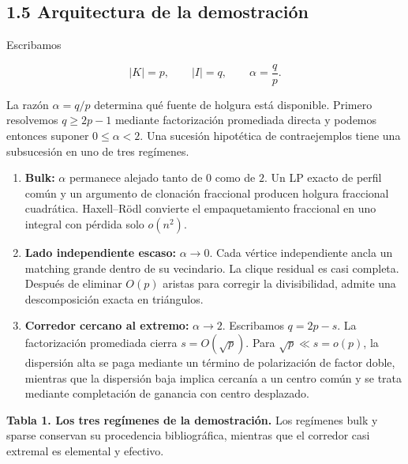 \documentclass[spanish,11pt,a4paper]{article}
\begin{document}
\subsection{1.5 Arquitectura de la
demostración}\label{arquitectura-de-la-demostraciuxf3n}

Escribamos

\[
|K|=p,
\qquad
|I|=q,
\qquad
\alpha=\frac qp.
\]

La razón \(\alpha=q/p\) determina qué fuente de holgura está disponible.
Primero resolvemos \(q\ge2p-1\) mediante factorización promediada
directa y podemos entonces suponer \(0\le\alpha<2\). Una sucesión
hipotética de contraejemplos tiene una subsucesión en uno de tres
regímenes.

\begin{enumerate}
\def\labelenumi{\arabic{enumi}.}
\item
  \textbf{Bulk:} \(\alpha\) permanece alejado tanto de \(0\) como de
  \(2\). Un LP exacto de perfil común y un argumento de clonación
  fraccional producen holgura fraccional cuadrática. Haxell--Rödl
  convierte el empaquetamiento fraccional en uno integral con pérdida
  solo \(o(n^2)\).
\item
  \textbf{Lado independiente escaso:} \(\alpha\to0\). Cada vértice
  independiente ancla un matching grande dentro de su vecindario. La
  clique residual es casi completa. Después de eliminar \(O(p)\) aristas
  para corregir la divisibilidad, admite una descomposición exacta en
  triángulos.
\item
  \textbf{Corredor cercano al extremo:} \(\alpha\to2\). Escribamos
  \(q=2p-s\). La factorización promediada cierra \(s=O(\sqrt p)\). Para
  \(\sqrt p\ll s=o(p)\), la dispersión alta se paga mediante un término
  de polarización de factor doble, mientras que la dispersión baja
  implica cercanía a un centro común y se trata mediante completación de
  ganancia con centro desplazado.
\end{enumerate}

\textbf{Tabla 1. Los tres regímenes de la demostración.} Los regímenes
bulk y sparse conservan su procedencia bibliográfica, mientras que el
corredor casi extremal es elemental y efectivo.
\end{document}
